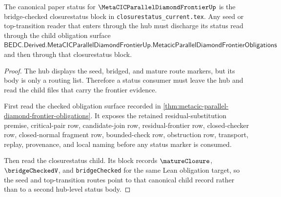 \begin{lemma}
\label{lem:metacic-parallel-diamond-frontier-canonical-closurestatus-reader}
The canonical paper status for $\MetaCICParallelDiamondFrontierUp$ is the bridge-checked closurestatus block in \texttt{closurestatus\_current.tex}. Any seed or top-transition reader that enters through the hub must discharge its status read through the child obligation surface
$
\mathsf{BEDC.Derived.MetaCICParallelDiamondFrontierUp.MetacicParallelDiamondFrontierObligations}
$
and then through that closurestatus block.
\end{lemma}
\begin{proof}
The hub displays the seed, bridged, and mature route markers, but its body is only a routing list. Therefore a status consumer must leave the hub and read the child files that carry the frontier evidence.

First read the checked obligation surface recorded in \autoref{thm:metacic-parallel-diamond-frontier-obligations}. It exposes the retained residual-substitution premise, critical-pair row, candidate-join row, residual-frontier row, closed-checker row, closed-normal fragment row, bounded-check row, obstruction row, transport, replay, provenance, and local naming before any status marker is consumed.

Then read the closurestatus child. Its block records $\matureClosure$, $\bridgeCheckedV$, and \texttt{bridgeChecked} for the same Lean obligation target, so the seed and top-transition routes point to that canonical child record rather than to a second hub-level status body.
\end{proof}
